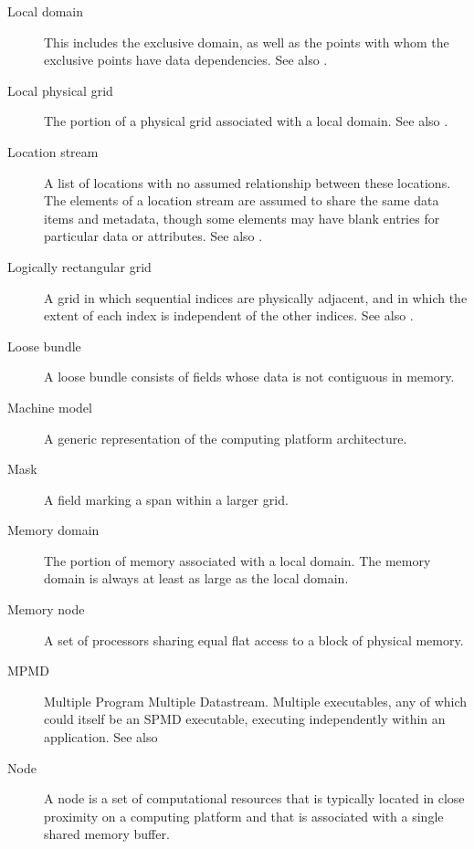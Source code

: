 \begin{description}
\item[Local domain] \label{glos:LocalDomain} This includes the exclusive 
  domain, as well as the points with whom the exclusive points have data 
  dependencies. See also .

\item[Local physical grid] \label{glos:LocPhysGrid} The portion of a 
  physical grid associated with a local domain.
  See also .  

\item[Location stream] \label{glos:LocStream} A list of
  locations with no assumed relationship between these locations.  The
  elements of a location stream are assumed to share the same data
  items and metadata, though some elements may have blank entries for
  particular data or attributes. See also .

\item[Logically rectangular grid] \label{glos:RecGrid} A grid in 
  which sequential indices are physically adjacent, and in which the 
  extent of each index is independent of the other indices.
  See also .

\item[Loose bundle] \label{glos:LooseBundle} A loose bundle consists of 
  fields whose data is not contiguous in memory.

\item[Machine model] A generic representation of the computing 
  platform architecture.

\item[Mask] \label{glos:Mask} A field marking a span within a larger grid.

\item[Memory domain] \label{glos:MemDomain} The portion of memory 
  associated with a local domain.  The memory domain is always at least 
  as large as the local domain.

\item[Memory node] \label{glos:Mnode} A set of processors
  sharing equal flat access to a block of physical memory.

\item[MPMD] \label{glos:MPMD} Multiple Program Multiple Datastream.
  Multiple executables, any of which could itself be an SPMD
  executable, executing independently within an application. 
  See also 

\item[Node] \label{glos:Node} A node is a set of computational resources
  that is typically located in close proximity on a computing platform
  and that is associated with a single shared memory buffer.


\end{description}
